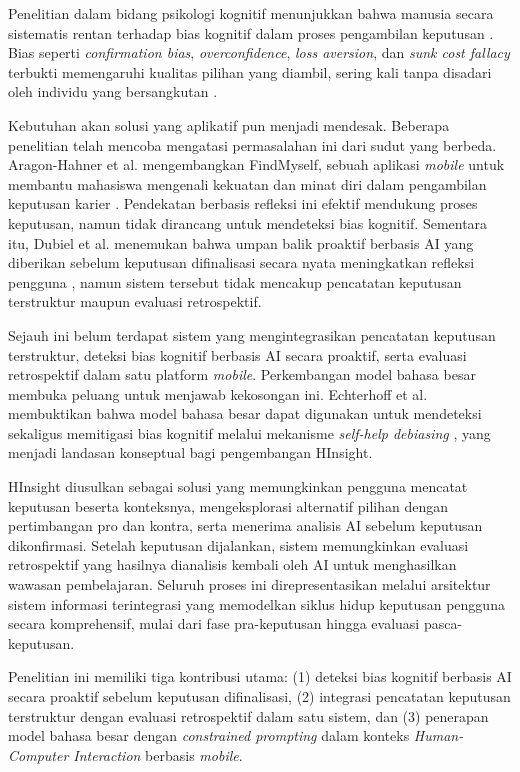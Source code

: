 \documentclass[11pt]{article}
\begin{document}
Penelitian dalam bidang psikologi kognitif menunjukkan bahwa manusia secara sistematis rentan terhadap bias kognitif dalam proses pengambilan keputusan \cite{tversky1974}. Bias seperti \textit{confirmation bias}, \textit{overconfidence}, \textit{loss aversion}, dan \textit{sunk cost fallacy} terbukti memengaruhi kualitas pilihan yang diambil, sering kali tanpa disadari oleh individu yang bersangkutan \cite{kahneman2011}. 

Kebutuhan akan solusi yang aplikatif pun menjadi mendesak. Beberapa penelitian telah mencoba mengatasi permasalahan ini dari sudut yang berbeda. Aragon-Hahner et al. mengembangkan FindMyself, sebuah aplikasi \textit{mobile} untuk membantu mahasiswa mengenali kekuatan dan minat diri dalam pengambilan keputusan karier \cite{aragon2023}. Pendekatan berbasis refleksi ini efektif mendukung proses keputusan, namun tidak dirancang untuk mendeteksi bias kognitif. Sementara itu, Dubiel et al. menemukan bahwa umpan balik proaktif berbasis AI yang diberikan sebelum keputusan difinalisasi secara nyata meningkatkan refleksi pengguna \cite{dubiel2024}, namun sistem tersebut tidak mencakup pencatatan keputusan terstruktur maupun evaluasi retrospektif.

Sejauh ini belum terdapat sistem yang mengintegrasikan pencatatan keputusan terstruktur, deteksi bias kognitif berbasis AI secara proaktif, serta evaluasi retrospektif dalam satu platform \textit{mobile}. Perkembangan model bahasa besar membuka peluang untuk menjawab kekosongan ini. Echterhoff et al. membuktikan bahwa model bahasa besar dapat digunakan untuk mendeteksi sekaligus memitigasi bias kognitif melalui mekanisme \textit{self-help debiasing} \cite{echterhoff2024}, yang menjadi landasan konseptual bagi pengembangan HInsight.

HInsight diusulkan sebagai solusi yang memungkinkan pengguna mencatat keputusan beserta konteksnya, mengeksplorasi alternatif pilihan dengan pertimbangan pro dan kontra, serta menerima analisis AI sebelum keputusan dikonfirmasi. Setelah keputusan dijalankan, sistem memungkinkan evaluasi retrospektif yang hasilnya dianalisis kembali oleh AI untuk menghasilkan wawasan pembelajaran. Seluruh proses ini direpresentasikan melalui arsitektur sistem informasi terintegrasi yang memodelkan siklus hidup keputusan pengguna secara komprehensif, mulai dari fase pra-keputusan hingga evaluasi pasca-keputusan.

Penelitian ini memiliki tiga kontribusi utama: (1) deteksi bias kognitif berbasis AI secara proaktif sebelum keputusan difinalisasi, (2) integrasi pencatatan keputusan terstruktur dengan evaluasi retrospektif dalam satu sistem, dan (3) penerapan model bahasa besar dengan \textit{constrained prompting} dalam konteks \textit{Human-Computer Interaction} berbasis \textit{mobile}.
\end{document}
